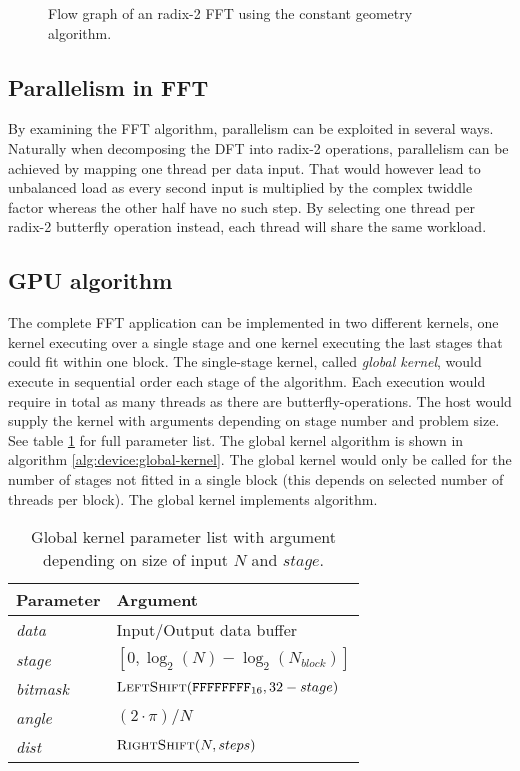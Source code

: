 \begin{figure}
	\centering
	
	\caption{Flow graph of an radix-2 \gls{FFT} using the constant geometry algorithm.}
	\label{fig:constant-geometry-8}
\end{figure}

\subsection{Parallelism in FFT}

By examining the \gls{FFT} algorithm, parallelism can be exploited in several ways. Naturally when decomposing the \gls{DFT} into radix-2 operations, parallelism can be achieved by mapping one thread per data input. That would however lead to unbalanced load as every second input is multiplied by the complex twiddle factor whereas the other half have no such step. By selecting one thread per radix-2 butterfly operation instead, each thread will share the same workload.

\subsection{GPU algorithm}

The complete \gls{FFT} application can be implemented in two different kernels, one kernel executing over a single stage and one kernel executing the last stages that could fit within one block. The single-stage kernel, called \emph{global kernel}, would execute in sequential order each stage of the algorithm. Each execution would require in total as many threads as there are butterfly-operations. The host would supply the kernel with arguments depending on stage number and problem size. See table \ref{tab:global-kernel} for full parameter list. The global kernel algorithm is shown in algorithm \ref{alg:device:global-kernel}. The global kernel would only be called for the number of stages not fitted in a single block (this depends on selected number of threads per block). The global kernel implements {\CTALG} algorithm.

\begin{table}
	\centering
	\begin{tabular}{|l|l|}
		\hline
		Parameter & Argument \\ \hline
		\textit{data} & Input/Output data buffer \\ \hline
		\textit{stage} & $[0,\log_{2}(N) - \log_{2}(N_{block})]$ \\ \hline
		\textit{bitmask} & $\Call{LeftShift}{\texttt{FFFFFFFF}_{16}, 32 - stage}$ \\ \hline
		\textit{angle} & $(2 \cdot \pi)/N$ \\ \hline
		\textit{dist} & $\Call{RightShift}{N, steps}$ \\ \hline		
	\end{tabular}
	\caption{Global kernel parameter list with argument depending on size of input $N$ and $stage$.}
	\label{tab:global-kernel}
\end{table}

